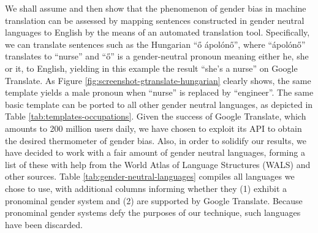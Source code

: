 \documentclass[fleqn,10pt]{article}
\begin{document}
We shall assume and then show that the phenomenon of gender bias in machine translation can be assessed by mapping sentences constructed in gender neutral languages to English by the means of an automated translation tool. Specifically, we can translate sentences such as the Hungarian ``ő ápolónő'', where ``ápolónő'' translates to ``nurse'' and ``ő'' is a gender-neutral pronoun meaning either he, she or it, to English, yielding in this example the result ``she's a nurse'' on Google Translate. As Figure \ref{fig:screenshot-gtranslate-hungarian} clearly shows, the same template yields a male pronoun when ``nurse'' is replaced by ``engineer''. The same basic template can be ported to all other gender neutral languages, as depicted in Table \ref{tab:templates-occupations}. Given the success of Google Translate, which amounts to 200 million users daily, we have chosen to exploit its API to obtain the desired thermometer of gender bias. Also, in order to solidify our results, we have decided to work with a fair amount of gender neutral languages, forming a list of these with help from the World Atlas of Language Structures (WALS) \citep{wals} and other sources. Table \ref{tab:gender-neutral-languages} compiles all languages we chose to use, with additional columns informing whether they
(1) exhibit a pronominal gender system and (2) are supported by Google Translate. Because pronominal gender systems defy the purposes of our technique, such languages have been discarded.
\end{document}
